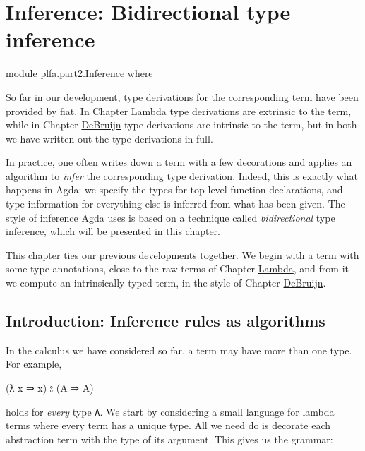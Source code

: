 \hypertarget{Inference}{%
\chapter{Inference: Bidirectional type inference}\label{Inference}}

\begin{fence}
\begin{code}
module plfa.part2.Inference where
\end{code}
\end{fence}

So far in our development, type derivations for the corresponding term
have been provided by fiat. In Chapter
\protect\hyperlink{Lambda}{Lambda} type derivations are extrinsic to the
term, while in Chapter \protect\hyperlink{DeBruijn}{DeBruijn} type
derivations are intrinsic to the term, but in both we have written out
the type derivations in full.

In practice, one often writes down a term with a few decorations and
applies an algorithm to \emph{infer} the corresponding type derivation.
Indeed, this is exactly what happens in Agda: we specify the types for
top-level function declarations, and type information for everything
else is inferred from what has been given. The style of inference Agda
uses is based on a technique called \emph{bidirectional} type inference,
which will be presented in this chapter.

This chapter ties our previous developments together. We begin with a
term with some type annotations, close to the raw terms of Chapter
\protect\hyperlink{Lambda}{Lambda}, and from it we compute an
intrinsically-typed term, in the style of Chapter
\protect\hyperlink{DeBruijn}{DeBruijn}.

\hypertarget{Inference-algorithms}{%
\section{Introduction: Inference rules as
algorithms}\label{Inference-algorithms}}

In the calculus we have considered so far, a term may have more than one
type. For example,

\begin{myDisplay}
(ƛ x ⇒ x) ⦂ (A ⇒ A)
\end{myDisplay}

holds for \emph{every} type \texttt{A}. We start by considering a small
language for lambda terms where every term has a unique type. All we
need do is decorate each abstraction term with the type of its argument.
This gives us the grammar:

